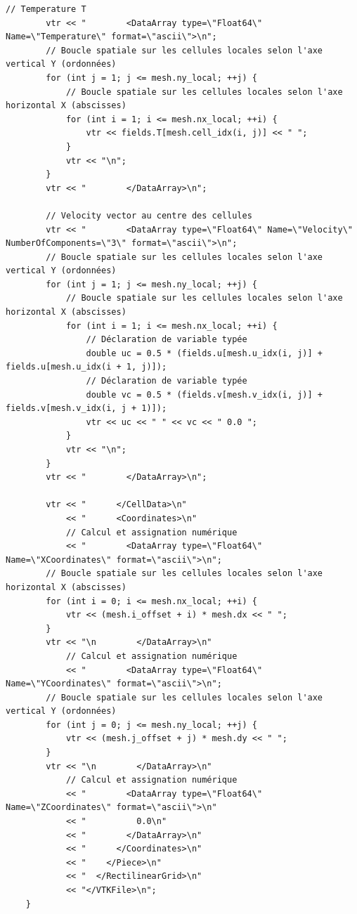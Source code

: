\documentclass[10pt,a4paper,oneside]{book}
\begin{document}
\begin{lstlisting}[language={[11]C++}]
        // Temperature T
        vtr << "        <DataArray type=\"Float64\" Name=\"Temperature\" format=\"ascii\">\n";
        // Boucle spatiale sur les cellules locales selon l'axe vertical Y (ordonnées)
        for (int j = 1; j <= mesh.ny_local; ++j) {
            // Boucle spatiale sur les cellules locales selon l'axe horizontal X (abscisses)
            for (int i = 1; i <= mesh.nx_local; ++i) {
                vtr << fields.T[mesh.cell_idx(i, j)] << " ";
            }
            vtr << "\n";
        }
        vtr << "        </DataArray>\n";

        // Velocity vector au centre des cellules
        vtr << "        <DataArray type=\"Float64\" Name=\"Velocity\" NumberOfComponents=\"3\" format=\"ascii\">\n";
        // Boucle spatiale sur les cellules locales selon l'axe vertical Y (ordonnées)
        for (int j = 1; j <= mesh.ny_local; ++j) {
            // Boucle spatiale sur les cellules locales selon l'axe horizontal X (abscisses)
            for (int i = 1; i <= mesh.nx_local; ++i) {
                // Déclaration de variable typée
                double uc = 0.5 * (fields.u[mesh.u_idx(i, j)] + fields.u[mesh.u_idx(i + 1, j)]);
                // Déclaration de variable typée
                double vc = 0.5 * (fields.v[mesh.v_idx(i, j)] + fields.v[mesh.v_idx(i, j + 1)]);
                vtr << uc << " " << vc << " 0.0 ";
            }
            vtr << "\n";
        }
        vtr << "        </DataArray>\n";

        vtr << "      </CellData>\n"
            << "      <Coordinates>\n"
            // Calcul et assignation numérique
            << "        <DataArray type=\"Float64\" Name=\"XCoordinates\" format=\"ascii\">\n";
        // Boucle spatiale sur les cellules locales selon l'axe horizontal X (abscisses)
        for (int i = 0; i <= mesh.nx_local; ++i) {
            vtr << (mesh.i_offset + i) * mesh.dx << " ";
        }
        vtr << "\n        </DataArray>\n"
            // Calcul et assignation numérique
            << "        <DataArray type=\"Float64\" Name=\"YCoordinates\" format=\"ascii\">\n";
        // Boucle spatiale sur les cellules locales selon l'axe vertical Y (ordonnées)
        for (int j = 0; j <= mesh.ny_local; ++j) {
            vtr << (mesh.j_offset + j) * mesh.dy << " ";
        }
        vtr << "\n        </DataArray>\n"
            // Calcul et assignation numérique
            << "        <DataArray type=\"Float64\" Name=\"ZCoordinates\" format=\"ascii\">\n"
            << "          0.0\n"
            << "        </DataArray>\n"
            << "      </Coordinates>\n"
            << "    </Piece>\n"
            << "  </RectilinearGrid>\n"
            << "</VTKFile>\n";
    }


\end{lstlisting}
\end{document}
